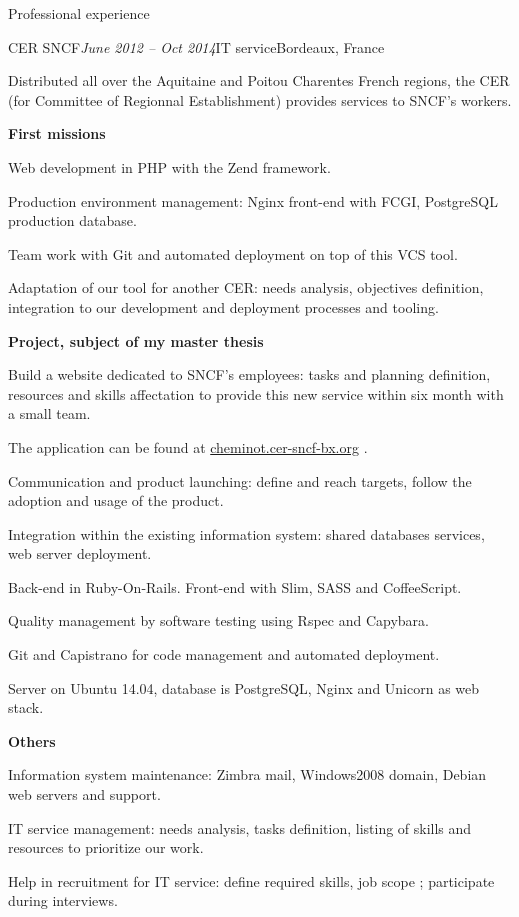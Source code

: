 \begin{rSection}{Professional experience}

  \begin{rSubsection}{CER SNCF}{\em June 2012 -- Oct 2014}{IT service}{Bordeaux, France}
    \item[] Distributed all over the Aquitaine and Poitou Charentes French regions, the CER (for Committee of Regionnal Establishment) provides services to SNCF's workers.

    \textbf{First missions}
      \item Web development in PHP with the Zend framework.
      \item Production environment management: Nginx front-end with FCGI, PostgreSQL production database.
      \item Team work with Git and automated deployment on top of this VCS tool.
      \item Adaptation of our tool for another CER: needs analysis, objectives definition, integration to our development and deployment processes and tooling.

    \textbf{Project, subject of my master thesis}
      \item Build a website dedicated to SNCF's employees: tasks and planning definition, resources and skills affectation to provide this new service within six month with a small team.
      \item The application can be found at \href{http://cheminot.cer-sncf-bx.org}{cheminot.cer-sncf-bx.org} .
      \item Communication and product launching: define and reach targets, follow the adoption and usage of the product.
      \item Integration within the existing information system: shared databases services, web server deployment.
      \item Back-end in Ruby-On-Rails. Front-end with Slim, SASS and CoffeeScript.
      \item Quality management by software testing using Rspec and Capybara.
      \item Git and Capistrano for code management and automated deployment.
      \item Server on Ubuntu 14.04, database is PostgreSQL, Nginx and Unicorn as web stack.

    \textbf{Others}
      \item Information system maintenance: Zimbra mail, Windows2008 domain, Debian web servers and support.
      \item IT service management: needs analysis, tasks definition, listing of skills and resources to prioritize our work.
      \item Help in recruitment for IT service: define required skills, job scope ; participate during interviews.


\end{rSubsection}
\end{rSection}
